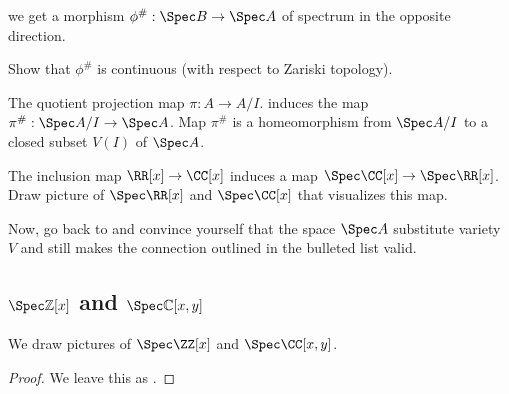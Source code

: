 we get a morphism $\phi^\# : \Spec B\to\Spec A$
of spectrum in the opposite direction.
\begin{exercise}
    Show that $\phi^\#$ is continuous (with respect to 
    Zariski topology).
\end{exercise}
\begin{example}
The quotient projection map $\pi : A\to A/I$.
induces the map $\pi^\# : \Spec A/I \to \Spec A$.
Map $\pi^\#$ is a homeomorphism from $\Spec A/I$
to a closed subset $V(I)$ of $\Spec A$.
\end{example}
\begin{exercise}
    The inclusion map $\RR[x]\to\CC[x]$ 
    induces a map $\Spec\CC[x]\to \Spec\RR[x]$.
    Draw picture of $\Spec\RR[x]$ and $\Spec\CC[x]$
    that visualizes this map.
\end{exercise}
Now, go back to  
and convince yourself that the space $\Spec A$
substitute variety $V$ and still makes the connection
outlined in the bulleted list valid.
\subsection{\texorpdfstring{$\Spec\mathbb Z[x]$}{Spec Z[x]} and 
\texorpdfstring{$\Spec\mathbb C[x,y]$}{Spec C[x,y]}}
We draw pictures of $\Spec \ZZ[x]$ and $\Spec\CC[x,y]$.
\begin{proof}
We leave this as .
\end{proof}
